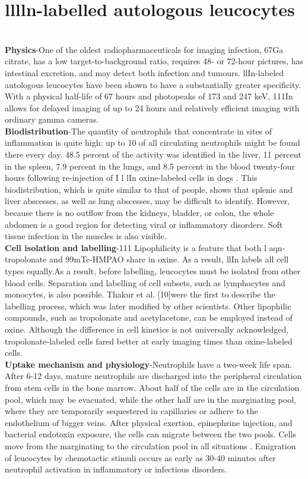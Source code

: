 \documentclass[12pt]{article}
\begin{document}
\section{lllln-labelled autologous leucocytes}
\\\textbf{Physics}-One of the oldest radiopharmaceuticals for imaging infection, 67Ga citrate, has a low target-to-background ratio, requires 48- or 72-hour pictures, has intestinal excretion, and may detect both infection and tumours. llIn-labeled autologous leucocytes have been shown to have a substantially greater specificity. With a physical half-life of 67 hours and photopeaks of 173 and 247 keV, 111In allows for delayed imaging of up to 24 hours and relatively efficient imaging with ordinary gamma cameras.
\\\textbf{Biodistribution}-The quantity of neutrophils that concentrate in sites of inflammation is quite high: up to 10 of all circulating neutrophils might be found there every day.
48.5 percent of the activity was identified in the liver, 11 percent in the spleen, 7.9 percent in the lungs, and 8.5 percent in the blood twenty-four hours following re-injection of I l lIn oxine-labeled cells in dogs . This biodistribution, which is quite similar to that of people, shows that splenic and liver abscesses, as well as lung abscesses, may be difficult to identify. However, because there is no outflow from the kidneys, bladder, or colon, the whole abdomen is a good region for detecting viral or inflammatory disorders. Soft tissue infection in the muscles is also visible.
\\\textbf{Cell isolation and labelling}-111 Lipophilicity is a feature that both l aqn-tropolonate and 99mTc-HMPAO share in oxine. As a result, llIn labels all cell types equally.As a result, before labelling, leucocytes must be isolated from other blood cells. Separation and labelling of cell subsets, such as lymphocytes and monocytes, is also possible. Thakur et al. [10]were the first to describe the labelling process, which was later modified by other scientists. Other lipophilic compounds, such as tropolonate and acetylacetone, can be employed instead of oxine. Although the difference in cell kinetics is not universally acknowledged, tropolonate-labeled cells fared better at early imaging times than oxine-labeled cells.
\\\textbf{Uptake mechanism and physiology}-Neutrophils have a two-week life span. After 6-12 days, mature neutrophils are discharged into the peripheral circulation from stem cells in the bone marrow. About half of the cells are in the circulation pool, which may be evacuated, while the other half are in the marginating pool, where they are temporarily sequestered in capillaries or adhere to the endothelium of bigger veins. After physical exertion, epinephrine injection, and bacterial endotoxin exposure, the cells can migrate between the two pools. Cells move from the marginating to the circulation pool in all situations . Emigration of leucocytes by chemotactic stimuli occurs as early as 30-40 minutes after neutrophil activation in inflammatory or infectious disorders.
\end{document}
